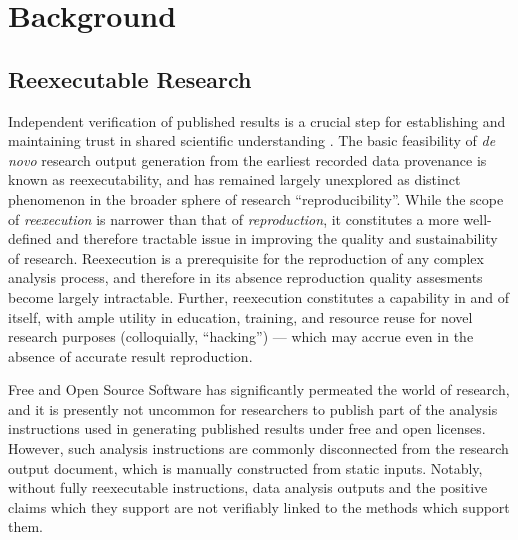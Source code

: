 \section{Background}

\subsection{Reexecutable Research}

Independent verification of published results is a crucial step for establishing and maintaining trust in shared scientific understanding \cite{rpp}.
The basic feasibility of \textit{de novo} research output generation from the earliest recorded data provenance is known as reexecutability, and  has remained largely unexplored as distinct phenomenon in the broader sphere of research “reproducibility”.
While the scope of \textit{reexecution} is narrower than that of \textit{reproduction}, it constitutes a more well-defined and therefore tractable issue in improving the quality and sustainability of research.
Reexecution is a prerequisite for the reproduction of any complex analysis process, and therefore in its absence reproduction quality assesments become largely intractable.
Further, reexecution constitutes a capability in and of itself, with ample utility in education, training, and resource reuse for novel research purposes (colloquially, “hacking”) — which may accrue even in the absence of accurate result reproduction.

Free and Open Source Software \cite{foss} has significantly permeated the world of research, and it is presently not uncommon for researchers to publish part of the analysis instructions used in generating published results \cite{TODO} under free and open licenses.
However, such analysis instructions are commonly disconnected from the research output document, which is manually constructed from static inputs.
Notably, without fully reexecutable instructions, data analysis outputs and the positive claims which they support are not verifiably linked to the methods which support them.

